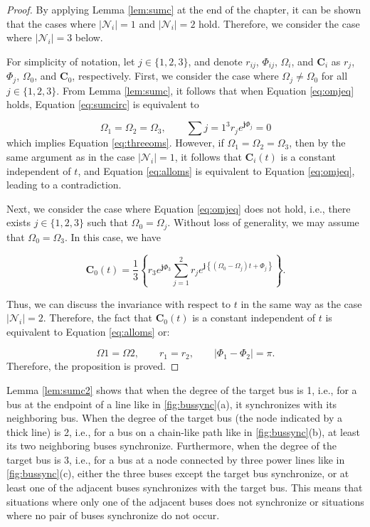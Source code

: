 \documentclass[graybox, envcountchap]{svmult}
\begin{document}
\begin{proof}
By applying Lemma \ref{lem:sumc} at the end of the chapter, it can be shown that
the cases where $|\mathcal{N}_i|=1$ and $|\mathcal{N}_i|=2$ hold. Therefore, we
consider the case where $|\mathcal{N}_i|=3$ below.

For simplicity of notation, let $j\in\{1,2,3\}$, and denote $r_{ij}$, $\Phi_{ij}$,
$\Omega_i$, and $\bm{C}_i$ as $r_{j}$, $\Phi_{j}$, $\Omega_0$, and $\bm{C}_0$,
respectively. First, we consider the case where $\Omega_j \neq \Omega_0$ for all
$j \in \{1,2,3\}$. From Lemma \ref{lem:sumc}, it follows that when Equation
\ref{eq:omjeq} holds, Equation \ref{eq:sumcirc} is equivalent to

\begin{equation*}
  \Omega_1 = \Omega_2 = \Omega_3,\qquad
  \sum{j=1}^3
  r_j e^{\bm{j} \Phi_j}=0
\end{equation*}
which implies Equation \ref{eq:threeoms}. However, if $\Omega_1 = \Omega_2 =
\Omega_3$, then by the same argument as in the case $|\mathcal{N}_i|=1$, it
follows that $\bm{C}_i(t)$ is a constant independent of $t$, and Equation
\ref{eq:alloms} is equivalent to Equation \ref{eq:omjeq}, leading to a
contradiction.

Next, we consider the case where Equation \ref{eq:omjeq} does not hold, i.e.,
there exists $j\in\{1,2,3\}$ such that $\Omega_0=\Omega_j$. Without loss of
generality, we may assume that $\Omega_0=\Omega_3$. In this case, we have

\begin{equation*}
  \bm{C}_0 (t) = \frac{1}{3} \left\{
    r_3 e^{\bm{j} \Phi_3}
    \sum_{j=1}^2
    r_{j}
    e^{\bm{j}
    \left\{
    (\Omega_0 - \Omega_j)t +
    \Phi_{j}
    \right\} }
  \right\}.
\end{equation*}

Thus, we can discuss the invariance with respect to $t$ in the same way as the
case $|\mathcal{N}_i|=2$. Therefore, the fact that $\bm{C}_0(t)$ is a constant
independent of $t$ is equivalent to Equation \ref{eq:alloms} or:

\begin{equation*}
  \Omega{1} = \Omega{2}
  ,\qquad
  r_{1} = r_{2}
  ,\qquad
  |\Phi_{1}-\Phi_{2}| = \pi.
\end{equation*}
Therefore, the proposition is proved.
\end{proof}

Lemma \ref{lem:sumc2} shows that when the degree of the target bus is 1, i.e.,
for a bus at the endpoint of a line like in \ref{fig:bussync}(a), it
synchronizes with its neighboring bus. When the degree of the target bus (the
node indicated by a thick line) is 2, i.e., for a bus on a chain-like path like
in \ref{fig:bussync}(b), at least its two neighboring buses synchronize.
Furthermore, when the degree of the target bus is 3, i.e., for a bus at a node
connected by three power lines like in \ref{fig:bussync}(c), either the three
buses except the target bus synchronize, or at least one of the adjacent buses
synchronizes with the target bus. This means that situations where only one of
the adjacent buses does not synchronize or situations where no pair of buses
synchronize do not occur.
\end{document}
